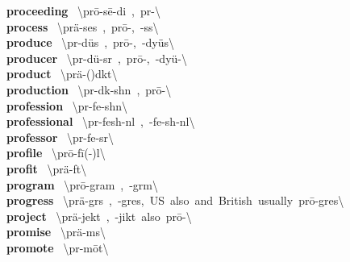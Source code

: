 \documentclass[10pt,a4paper]{article}
\begin{document}
\begin{multicols}{2}
\textbf{ proceeding }\quad \ \textbackslash pr\={o}-\textprimstress s\={e}-di\engma \ ,\ pr\textschwa -\textbackslash \\
\textbf{ process }\quad \ \textbackslash \textprimstress pr\"{a}-\textsecstress ses\ ,\ \textprimstress pr\={o}-,\ -s\textschwa s\textbackslash \\
\textbf{ produce }\quad \ \textbackslash pr\textschwa -\textprimstress d\"{u}s\ ,\ pr\={o}-,\ -\textprimstress dy\"{u}s\textbackslash \\
\textbf{ producer }\quad \ \textbackslash pr\textschwa -\textprimstress d\"{u}-s\textschwa r\ ,\ pr\={o}-,\ -\textprimstress dy\"{u}-\textbackslash \\
\textbf{ product }\quad \ \textbackslash \textprimstress pr\"{a}-(\textsecstress )d\textschwa kt\textbackslash \\
\textbf{ production }\quad \ \textbackslash pr\textschwa -\textprimstress d\textschwa k-sh\textschwa n\ ,\ pr\={o}-\textbackslash \\
\textbf{ profession }\quad \ \textbackslash pr\textschwa -\textprimstress fe-sh\textschwa n\textbackslash \\
\textbf{ professional }\quad \ \textbackslash pr\textschwa -\textprimstress fesh-n\textschwa l\ ,\ -\textprimstress fe-sh\textschwa -n\textsuperscript{\textreve}l\textbackslash \\
\textbf{ professor }\quad \ \textbackslash pr\textschwa -\textprimstress fe-s\textschwa r\textbackslash \\
\textbf{ profile }\quad \ \textbackslash \textprimstress pr\={o}-\textsecstress f\={i}(-\textschwa )l\textbackslash \\
\textbf{ profit }\quad \ \textbackslash \textprimstress pr\"{a}-f\textschwa t\textbackslash \\
\textbf{ program }\quad \ \textbackslash \textprimstress pr\={o}-\textsecstress gram\ ,\ -gr\textschwa m\textbackslash \\
\textbf{ progress }\quad \ \textbackslash \textprimstress pr\"{a}-gr\textschwa s\ ,\ -\textsecstress gres,\ US\ also\ and\ British\ usually\ \textprimstress pr\={o}-\textsecstress gres\textbackslash \\
\textbf{ project }\quad \ \textbackslash \textprimstress pr\"{a}-\textsecstress jekt\ ,\ -jikt\ also\ \textprimstress pr\={o}-\textbackslash \\
\textbf{ promise }\quad \ \textbackslash \textprimstress pr\"{a}-m\textschwa s\textbackslash \\
\textbf{ promote }\quad \ \textbackslash pr\textschwa -\textprimstress m\={o}t\textbackslash \\

\end{multicols}
\end{document}
